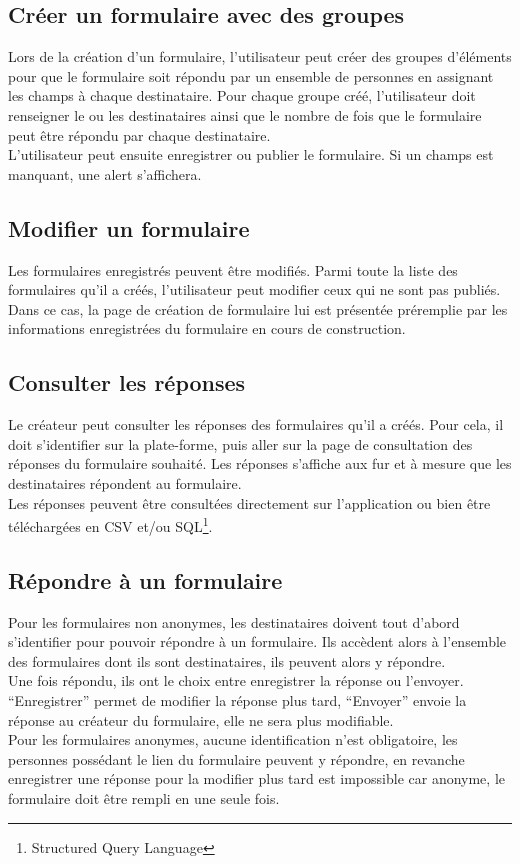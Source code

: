 \documentclass{sigplanconf}
\begin{document}
\subsection{Créer un formulaire avec des groupes}
Lors de la création d'un formulaire, l'utilisateur peut créer des groupes d'éléments pour que le formulaire soit répondu par un ensemble de personnes en assignant les champs à chaque destinataire. Pour chaque groupe créé, l'utilisateur doit renseigner le ou les destinataires ainsi que le nombre de fois que le formulaire peut être répondu par chaque destinataire.\\
L'utilisateur peut ensuite enregistrer ou publier le formulaire. Si un champs est manquant, une alert s'affichera.

\subsection{Modifier un formulaire}
Les formulaires enregistrés peuvent être modifiés. Parmi toute la liste des formulaires qu’il a créés, l’utilisateur peut modifier ceux qui ne sont pas publiés. Dans ce cas, la page de création de formulaire lui est présentée préremplie par les informations enregistrées du formulaire en cours de construction. 

\subsection{Consulter les réponses}
Le créateur peut consulter les réponses des formulaires qu’il a créés. Pour cela, il doit s’identifier sur la plate-forme, puis aller sur la page de consultation des réponses du formulaire souhaité. Les réponses s’affiche aux fur et à mesure que les destinataires répondent au formulaire.\\
Les réponses peuvent être consultées directement sur l’application ou bien être téléchargées en CSV et/ou SQL\footnote{Structured Query Language}.

\subsection{Répondre à un formulaire}
Pour les formulaires non anonymes, les destinataires doivent tout d’abord s’identifier pour pouvoir répondre à un formulaire. Ils accèdent alors à l’ensemble des formulaires dont ils sont destinataires, ils peuvent alors y répondre. \\
Une fois répondu, ils ont le choix entre enregistrer la réponse ou l'envoyer. “Enregistrer” permet de modifier la réponse plus tard, “Envoyer” envoie la réponse au créateur du formulaire, elle ne sera plus modifiable.\\
Pour les formulaires anonymes, aucune identification n’est obligatoire, les personnes possédant le lien du formulaire peuvent y répondre, en revanche enregistrer une réponse pour la modifier plus tard est impossible car anonyme, le formulaire doit être rempli en une seule fois.
\end{document}
